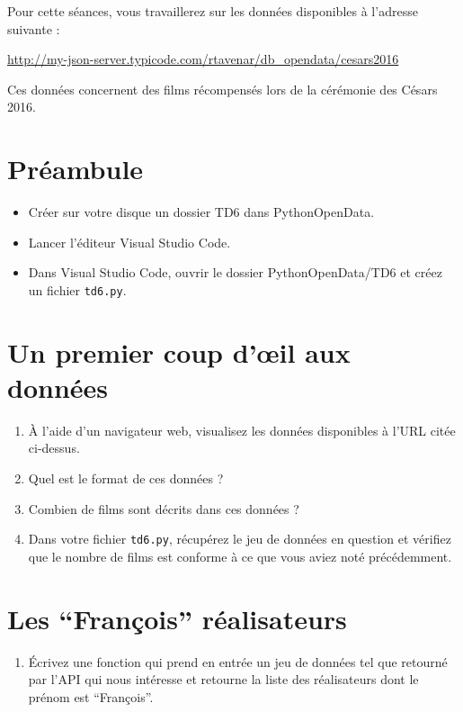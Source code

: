\documentclass[11pt,a4paper]{article}
\begin{document}
Pour cette séances, vous travaillerez sur les données disponibles à l'adresse suivante :

\begin{center}
    \url{http://my-json-server.typicode.com/rtavenar/db_opendata/cesars2016}
\end{center}

Ces données concernent des films récompensés lors de la cérémonie des Césars 2016.

\section*{Préambule}
\begin{itemize}
    \item Créer sur votre disque un dossier TD6 dans PythonOpenData.
    \item Lancer l'éditeur Visual Studio Code.
    \item Dans Visual Studio Code, ouvrir le dossier PythonOpenData/TD6 et créez un fichier \verb+td6.py+. 
\end{itemize}



\section{Un premier coup d'\oe{}il aux données}

\begin{enumerate}
    \item À l'aide d'un navigateur web, visualisez les données disponibles à l'URL citée ci-dessus.
    \item Quel est le format de ces données ?
    \item Combien de films sont décrits dans ces données ?
    \item Dans votre fichier \verb+td6.py+, récupérez le jeu de données en question et vérifiez que le nombre de films est conforme à ce que vous aviez noté précédemment.
\end{enumerate}

\section{Les ``François'' réalisateurs}

\begin{enumerate}
    \item Écrivez une fonction qui prend en entrée un jeu de données tel que retourné par l'API qui nous intéresse et retourne la liste des réalisateurs dont le prénom est ``François''.
\end{enumerate}
\end{document}
